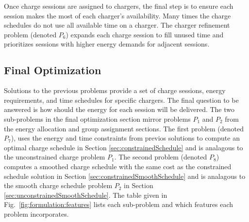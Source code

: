 \par Once charge sessions are assigned to chargers, the final step is to ensure each session makes the most of each charger's availability. Many times the charge schedules do not use all available time on a charger. The charger refinement problem (denoted $P_6$) expands each charge session to fill unused time and prioritizes sessions with higher energy demands for adjacent sessions.

\subsection{Final Optimization}

Solutions to the previous problems provide a set of charge sessions, energy requirements, and time schedules for specific chargers. The final question to be answered is how should the energy for each session will be delivered. The two sub-problems in the final optimization section mirror problems $P_1$ and $P_2$ from the energy allocation and group assignment sections. The first problem (denoted $P_7$), uses the energy and time constraints from previos solutions to compute an optimal charge schedule in Section \ref{sec:constrainedSchedule} and is analagous to the unconstrained charge problem $P_1$. The second problem (denoted $P_8$) computes a smoothed charge schedule with the same cost as the constrained schedule solution in Section \ref{sec:constrainedSmoothSchedule} and is analagous to the smooth charge schedule problem $P_2$ in Section \ref{sec:unconstrainedSmoothSchedule}. The table given in Fig.~\ref{fig:formulation:features} lists each sub-problem and which features each problem incorporates.

 
 
 


